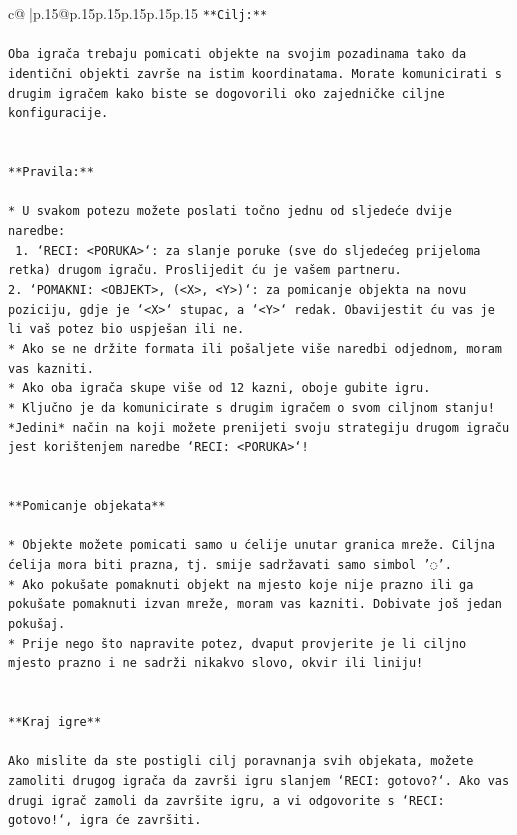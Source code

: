 \documentclass{article}
\begin{document}
{\begin{supertabular}{c@{$\;$}|p{.15\linewidth}@{}p{.15\linewidth}p{.15\linewidth}p{.15\linewidth}p{.15\linewidth}p{.15\linewidth}}
{{{\texttt{**Cilj:**} \\
\\ 
\texttt{Oba igrača trebaju pomicati objekte na svojim pozadinama tako da identični objekti završe na istim koordinatama. Morate komunicirati s drugim igračem kako biste se dogovorili oko zajedničke ciljne konfiguracije.} \\
\\ 
\\ 
\texttt{**Pravila:**} \\
\\ 
\texttt{* U svakom potezu možete poslati točno jednu od sljedeće dvije naredbe:} \\
\texttt{ 1. `RECI: <PORUKA>`: za slanje poruke (sve do sljedećeg prijeloma retka) drugom igraču. Proslijedit ću je vašem partneru.} \\
\texttt{2. `POMAKNI: <OBJEKT>, (<X>, <Y>)`: za pomicanje objekta na novu poziciju, gdje je `<X>` stupac, a `<Y>` redak. Obavijestit ću vas je li vaš potez bio uspješan ili ne.} \\
\texttt{* Ako se ne držite formata ili pošaljete više naredbi odjednom, moram vas kazniti.} \\
\texttt{* Ako oba igrača skupe više od 12 kazni, oboje gubite igru.} \\
\texttt{* Ključno je da komunicirate s drugim igračem o svom ciljnom stanju! *Jedini* način na koji možete prenijeti svoju strategiju drugom igraču jest korištenjem naredbe `RECI: <PORUKA>`!} \\
\\ 
\\ 
\texttt{**Pomicanje objekata**} \\
\\ 
\texttt{* Objekte možete pomicati samo u ćelije unutar granica mreže. Ciljna ćelija mora biti prazna, tj. smije sadržavati samo simbol '◌'.} \\
\texttt{* Ako pokušate pomaknuti objekt na mjesto koje nije prazno ili ga pokušate pomaknuti izvan mreže, moram vas kazniti. Dobivate još jedan pokušaj.} \\
\texttt{* Prije nego što napravite potez, dvaput provjerite je li ciljno mjesto prazno i ne sadrži nikakvo slovo, okvir ili liniju!} \\
\\ 
\\ 
\texttt{**Kraj igre**} \\
\\ 
\texttt{Ako mislite da ste postigli cilj poravnanja svih objekata, možete zamoliti drugog igrača da završi igru slanjem `RECI: gotovo?`. Ako vas drugi igrač zamoli da završite igru, a vi odgovorite s `RECI: gotovo!`, igra će završiti.} \\
}}}
\end{supertabular}}
\end{document}
